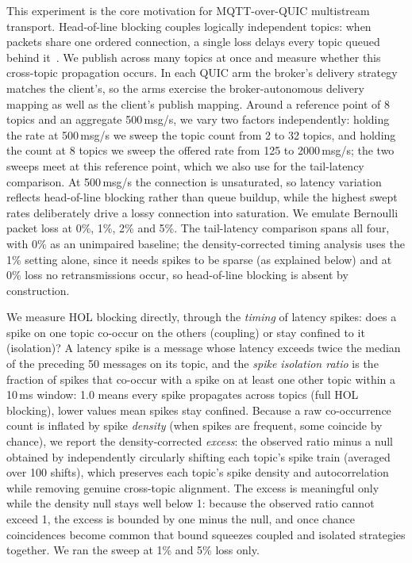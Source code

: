 \documentclass[a4paper,fleqn]{cas-dc}
\begin{document}
This experiment is the core motivation for MQTT-over-QUIC multistream transport. Head-of-line blocking couples logically independent topics: when packets share one ordered connection, a single loss delays every topic queued behind it~\cite{scharf2006hol}. We publish across many topics at once and measure whether this cross-topic propagation occurs. In each QUIC arm the broker's delivery strategy matches the client's, so the arms exercise the broker-autonomous delivery mapping as well as the client's publish mapping. Around a reference point of 8 topics and an aggregate 500\,msg/s, we vary two factors independently: holding the rate at 500\,msg/s we sweep the topic count from 2 to 32 topics, and holding the count at 8 topics we sweep the offered rate from 125 to 2000\,msg/s; the two sweeps meet at this reference point, which we also use for the tail-latency comparison. At 500\,msg/s the connection is unsaturated, so latency variation reflects head-of-line blocking rather than queue buildup, while the highest swept rates deliberately drive a lossy connection into saturation. We emulate Bernoulli packet loss at 0\%, 1\%, 2\% and 5\%. The tail-latency comparison spans all four, with 0\% as an unimpaired baseline; the density-corrected timing analysis uses the 1\% setting alone, since it needs spikes to be sparse (as explained below) and at 0\% loss no retransmissions occur, so head-of-line blocking is absent by construction.

We measure HOL blocking directly, through the \emph{timing} of latency spikes: does a spike on one topic co-occur on the others (coupling) or stay confined to it (isolation)? A latency spike is a message whose latency exceeds twice the median of the preceding 50 messages on its topic, and the \emph{spike isolation ratio} is the fraction of spikes that co-occur with a spike on at least one other topic within a 10\,ms window: 1.0 means every spike propagates across topics (full HOL blocking), lower values mean spikes stay confined. Because a raw co-occurrence count is inflated by spike \emph{density} (when spikes are frequent, some coincide by chance), we report the density-corrected \emph{excess}: the observed ratio minus a null obtained by independently circularly shifting each topic's spike train (averaged over 100 shifts), which preserves each topic's spike density and autocorrelation while removing genuine cross-topic alignment. The excess is meaningful only while the density null stays well below 1: because the observed ratio cannot exceed 1, the excess is bounded by one minus the null, and once chance coincidences become common that bound squeezes coupled and isolated strategies together. We ran the sweep at 1\% and 5\% loss only.
\end{document}
